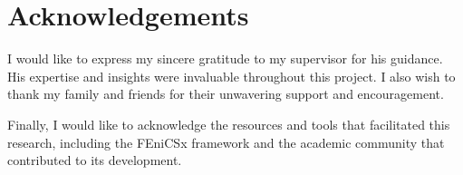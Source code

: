 \chapter*{Acknowledgements}

I would like to express my sincere gratitude to my supervisor for his guidance. His expertise and insights were invaluable throughout this project. I also wish to thank my family and friends for their unwavering support and encouragement.

Finally, I would like to acknowledge the resources and tools that facilitated this research, including the FEniCSx framework and the academic community that contributed to its development.
